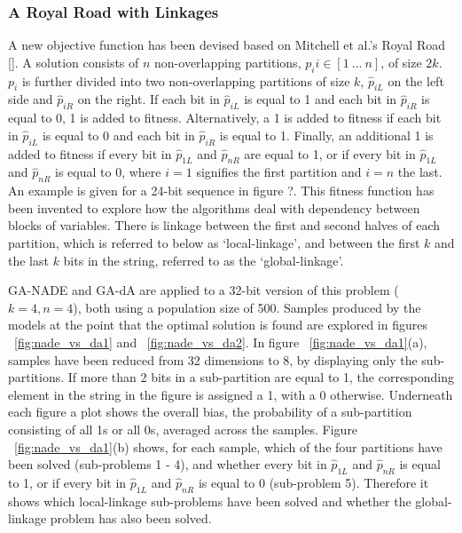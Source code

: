 \documentclass[twoside]{article}
\begin{document}
\subsubsection{A Royal Road with Linkages}
A new objective function has been devised based on Mitchell et al.'s Royal Road [\cite{mitchell}]. A solution consists of \(n\) non-overlapping partitions, \(p_i i\in{[1\ ... \ n]}\), of size \(2k\). \(p_i\) is further divided into two non-overlapping partitions of size \(k\), \(\hat{p}_{iL}\) on the left side and \(\hat{p}_{iR}\) on the right. If each bit in \(\hat{p}_{iL}\) is equal to 1 and each bit in \(\hat{p}_{iR}\) is equal to 0, 1 is added to fitness. Alternatively, a 1 is added to fitness if each bit in \(\hat{p}_{iL}\) is equal to 0 and each bit in \(\hat{p}_{iR}\) is equal to 1. Finally, an additional 1 is added to fitness if every bit in \(\hat{p}_{1L}\) and \(\hat{p}_{nR}\) are equal to 1, or if every bit in \(\hat{p}_{1L}\) and \(\hat{p}_{nR}\) is equal to 0, where \(i=1\) signifies the first partition and \(i=n\) the last. An example is given for a 24-bit sequence in figure ?. This fitness function has been invented to explore how the algorithms deal with dependency between blocks of variables. There is linkage between the first and second halves of each partition, which is referred to below as `local-linkage', and between the first \(k\) and the last \(k\) bits in the string, referred to as the `global-linkage'.

GA-NADE and GA-dA are applied to a 32-bit version of this problem (\(k=4,n=4\)), both using a population size of 500. Samples produced by the models at the point that the optimal solution is found are explored in figures ~\ref{fig:nade_vs_da1} and ~\ref{fig:nade_vs_da2}. In figure ~\ref{fig:nade_vs_da1}(a), samples have been reduced from 32 dimensions to 8, by displaying only the sub-partitions. If more than 2 bits in a sub-partition are equal to 1, the corresponding element in the string in the figure is assigned a 1, with a 0 otherwise. Underneath each figure a plot shows the overall bias, the probability of a sub-partition consisting of all 1s or all 0s, averaged across the samples. Figure ~\ref{fig:nade_vs_da1}(b) shows, for each sample, which of the four partitions have been solved (sub-problems 1 - 4), and whether every bit in \(\hat{p}_{1L}\) and \(\hat{p}_{nR}\) is equal to 1, or if every bit in \(\hat{p}_{1L}\) and \(\hat{p}_{nR}\) is equal to 0 (sub-problem 5). Therefore it shows which local-linkage sub-problems have been solved and whether the global-linkage problem has also been solved.
\end{document}
